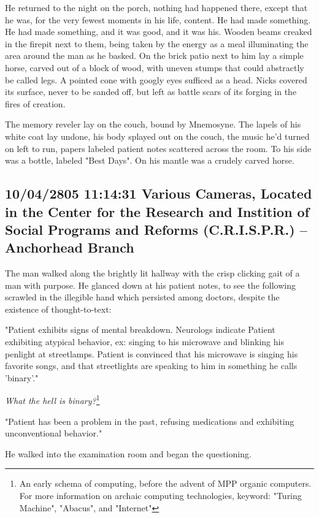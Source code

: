 \documentclass[12pt]{article}
\begin{document}
He returned to the night on the porch, nothing had happened there, except that he was, for the very fewest moments in his life, content. He had made something. He had made something, and it was good, and it was his. Wooden beams creaked in the firepit next to them, being taken by the energy as a meal illuminating the area around the man as he basked. On the brick patio next to him lay a simple horse, carved out of a block of wood, with uneven stumps that could abstractly be called legs. A pointed cone with googly eyes sufficed as a head. Nicks covered its surface, never to be sanded off, but left as battle scars of its forging in the fires of creation.

The memory reveler lay on the couch, bound by Mnemosyne. The lapels of his white coat lay undone, his body splayed out on the couch, the music he'd turned on left to run, papers labeled patient notes scattered across the room. To his side was a bottle, labeled "Best Days". On his mantle was a crudely carved horse.

\subsection*{10/04/2805 11:14:31 Various Cameras, Located in the Center for the Research and Instition of Social Programs and Reforms (C.R.I.S.P.R.) -- Anchorhead Branch}
\label{sec:org1757ec5}

The man walked along the brightly lit hallway with the crisp clicking gait of a man with purpose. He glanced down at his patient notes, to see the following scrawled in the illegible hand which persisted among doctors, despite the existence of thought-to-text:

"Patient exhibits signs of mental breakdown. Neurologs indicate Patient exhibiting atypical behavior, ex: singing to his microwave and blinking his penlight at streetlamps. Patient is convinced that his microwave is singing his favorite songs, and that streetlights are speaking to him in something he calls 'binary'."

\emph{What the hell is binary?}\footnote{An early schema of computing, before the advent of MPP organic computers. For more information on archaic computing technologies, keyword: "Turing Machine", "Abacus", and "Internet"}

"Patient has been a problem in the past, refusing medications and exhibiting unconventional behavior."

He walked into the examination room and began the questioning.
\end{document}
